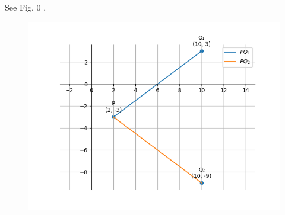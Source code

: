 \documentclass[journal]{IEEEtran}
\begin{document}
See Fig. 0 ,
\newpage
\begin{figure}[H]
\begin{center}
\includegraphics[width=0.8\columnwidth]{figs/fig.png}
\end{center}
\caption{}
\label{fig:Fig1}
\end{figure}
\end{document}

